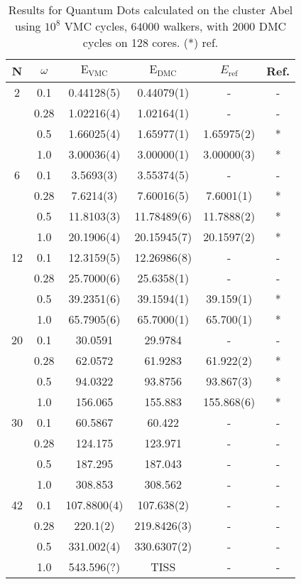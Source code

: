\begin{table}
\begin{center}
\begin{tabular}{cc|cccc}
    N     & $\omega$ & $\mathrm{E_{VMC}}$ & $\mathrm{E_{DMC}}$ & $E_\mathrm{ref}$ & Ref.\\
\hline\hline
    2     &   0.1    & 0.44128(5) & 0.44079(1)     & - & -\\
          &   0.28   & 1.02216(4) & 1.02164(1)     & - & -\\
          &   0.5    & 1.66025(4) & 1.65977(1)     & 1.65975(2) & *\\
          &   1.0    & 3.00036(4) & 3.00000(1)     & 3.00000(3) & *\\
\hline        
    6     &   0.1    & 3.5693(3)   & 3.55374(5)    & - & - \\
          &   0.28   & 7.6214(3)   & 7.60016(5)    & 7.6001(1) & *\\ 
          &   0.5    & 11.8103(3)  & 11.78489(6)   & 11.7888(2) & *\\
          &   1.0    & 20.1906(4)  & 20.15945(7)   & 20.1597(2) & * \\
\hline
    12    &   0.1    & 12.3159(5)  & 12.26986(8)  & - & -\\
          &   0.28   & 25.7000(6)  & 25.6358(1)   & - & -\\
          &   0.5    & 39.2351(6)  & 39.1594(1)   & 39.159(1) & *\\
          &   1.0    & 65.7905(6)  & 65.7000(1)   & 65.700(1) & *\\
\hline
    20    &   0.1    & 30.0591  & 29.9784       & - & - \\
          &   0.28   & 62.0572  & 61.9283       & 61.922(2) & *\\
          &   0.5    & 94.0322  & 93.8756    & 93.867(3) & * \\
          &   1.0    & 156.065  & 155.883  & 155.868(6) & *\\
\hline
    30    &   0.1    & 60.5867  &  60.422 & - & - \\
          &   0.28   & 124.175  & 123.971 & - & -\\
          &   0.5    & 187.295  & 187.043 & - & -\\
          &   1.0    & 308.853  & 308.562 & - & - \\
\hline
    42    &   0.1    &  107.8800(4)  & 107.638(2)   & - & - \\
          &   0.28   &  220.1(2)     & 219.8426(3)  & - & - \\
          &   0.5    & 331.002(4)    & 330.6307(2)  & - & - \\
          &   1.0    & 543.596(?)    &  TISS        & - & - \\

\end{tabular}
\caption{Results for Quantum Dots calculated on the cluster Abel using $10^8$ VMC cycles, $64000$ walkers, with $2000$ DMC cycles on 128 cores. (*) ref. \cite{MagnusArticle}}
\end{center}
\end{table}


\cite{inf3331}
